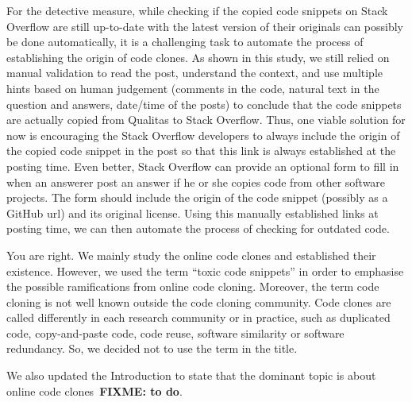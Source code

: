 \documentclass[a4paper,twoside,10pt]{reviewresponse}
\newcommand\FIXME[1]{{\color{red}\textbf{FIXME: #1}}}
\begin{document}
For the detective measure, while checking if the copied code snippets on Stack Overflow are still up-to-date with the latest version of their originals can possibly be done automatically, it is a challenging task to automate the process of establishing the origin of code clones. As shown in this study, we still relied on manual validation to read the post, understand the context, and use multiple hints based on human judgement (comments in the code, natural text in the question and answers, date/time of the posts) to conclude that the code snippets are actually copied from Qualitas to Stack Overflow. Thus, one viable solution for now is encouraging the Stack Overflow developers to always include the origin of the copied code snippet in the post so that this link is always established at the posting time. Even better, Stack Overflow can provide an optional form to fill in when an answerer post an answer if he or she copies code from other software projects. The form should include the origin of the code snippet (possibly as a GitHub url) and its original license. Using this manually established links at posting time, we can then automate the process of checking for outdated code.


You are right. We mainly study the online code clones and established their existence. However, we used the term ``toxic code snippets'' in order to emphasise the possible ramifications from online code cloning. 
Moreover, the term code cloning is not well known outside the code cloning community. Code clones are called differently in each research community or in practice, such as duplicated code, copy-and-paste code, code reuse, software similarity or software redundancy. So, we decided not to use the term in the title. 

We also updated the Introduction to state that the dominant topic is about online code clones~\FIXME{to do}.

\end{document}
